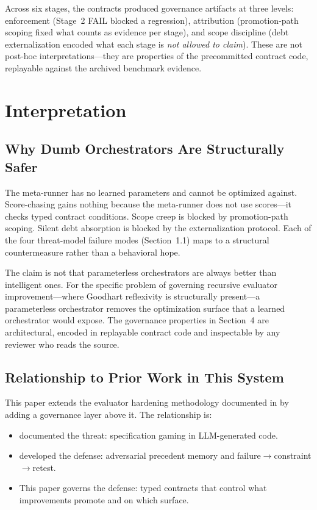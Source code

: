 \documentclass[11pt]{article}
\begin{document}
Across six stages, the contracts produced governance artifacts at three levels: enforcement (Stage~2 FAIL blocked a regression), attribution (promotion-path scoping fixed what counts as evidence per stage), and scope discipline (debt externalization encoded what each stage is \emph{not allowed to claim}). These are not post-hoc interpretations---they are properties of the precommitted contract code, replayable against the archived benchmark evidence.


\section{Interpretation}

\subsection{Why Dumb Orchestrators Are Structurally Safer}

The meta-runner has no learned parameters and cannot be optimized against. Score-chasing gains nothing because the meta-runner does not use scores---it checks typed contract conditions. Scope creep is blocked by promotion-path scoping. Silent debt absorption is blocked by the externalization protocol. Each of the four threat-model failure modes (Section~1.1) maps to a structural countermeasure rather than a behavioral hope.

The claim is not that parameterless orchestrators are always better than intelligent ones. For the specific problem of governing recursive evaluator improvement---where Goodhart reflexivity is structurally present---a parameterless orchestrator removes the optimization surface that a learned orchestrator would expose. The governance properties in Section~4 are architectural, encoded in replayable contract code and inspectable by any reviewer who reads the source.

\subsection{Relationship to Prior Work in This System}

This paper extends the evaluator hardening methodology documented in \citet{alami2025b} by adding a governance layer above it. The relationship is:

\begin{itemize}[nosep]
\item \citet{alami2025a} documented the threat: specification gaming in LLM-generated code.
\item \citet{alami2025b} developed the defense: adversarial precedent memory and failure$\to$constraint$\to$retest.
\item This paper governs the defense: typed contracts that control what improvements promote and on which surface.
\end{itemize}
\end{document}

